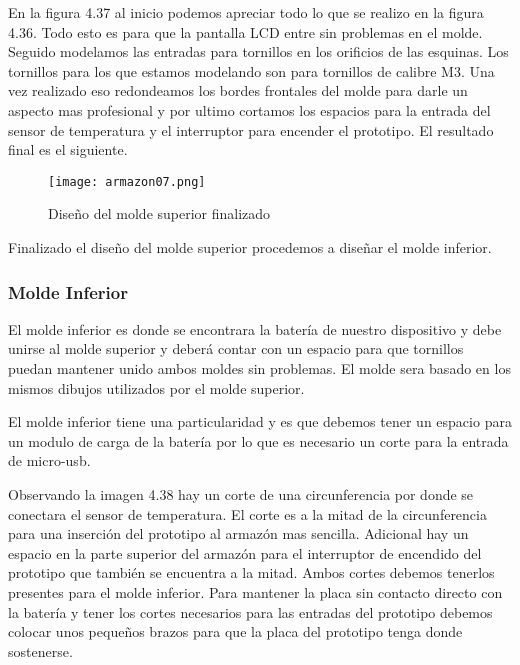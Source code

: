 \par \noindent
En la figura 4.37 al inicio podemos apreciar todo lo que se realizo en la figura 4.36. Todo esto es para que la pantalla LCD entre sin problemas en el molde. Seguido modelamos las entradas para tornillos en los orificios de las esquinas. Los tornillos para los que estamos modelando son para tornillos de calibre M3. Una vez realizado eso redondeamos los bordes frontales del molde para darle un aspecto mas profesional y por ultimo cortamos los espacios para la entrada del sensor de temperatura y el interruptor para encender el prototipo. El resultado final es el siguiente.

\begin{figure}[H]
	\centering
	\texttt{[image: armazon07.png]}
	\caption{Diseño del molde superior finalizado}
\end{figure}

\par \noindent
Finalizado el diseño del molde superior procedemos a diseñar el molde inferior.

\subsubsection{Molde Inferior}

\par \noindent
El molde inferior es donde se encontrara la batería de nuestro dispositivo y debe unirse al molde superior y deberá contar con un espacio para que tornillos puedan mantener unido ambos moldes sin problemas. El molde sera basado en los mismos dibujos utilizados por el molde superior. 

\par \noindent
El molde inferior tiene una particularidad y es que debemos tener un espacio para un modulo de carga de la batería por lo que es necesario un corte para la entrada de micro-usb. 

\par \noindent
Observando la imagen 4.38 hay un corte de una circunferencia por donde se conectara el sensor de temperatura. El corte es a la mitad de la circunferencia para una inserción del prototipo al armazón mas sencilla. Adicional hay un espacio en la parte superior del armazón para el interruptor de encendido del prototipo que también se encuentra a la mitad. Ambos cortes debemos tenerlos presentes para el molde inferior. Para mantener la placa sin contacto directo con la batería y tener los cortes necesarios para las entradas del prototipo debemos colocar unos pequeños brazos para que la placa del prototipo tenga donde sostenerse.

